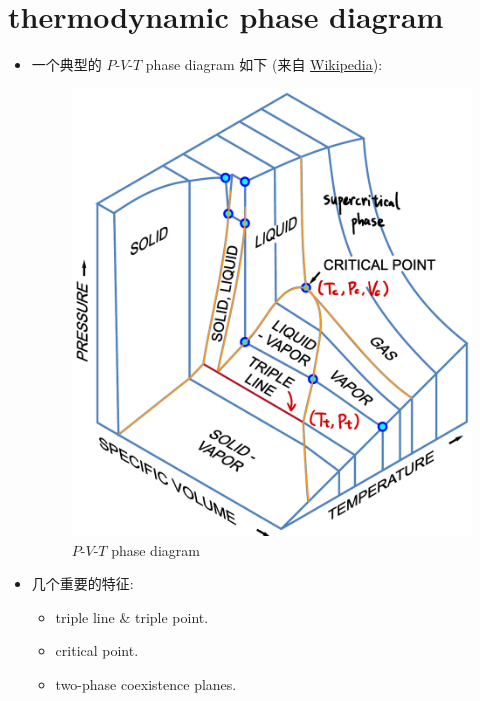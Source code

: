 \section{thermodynamic phase diagram}
\begin{itemize}
	\item 一个典型的 $P$-$V$-$T$ phase diagram 如下 (来自 \href{https://en.wikipedia.org/wiki/File:PVT_3D_diagram-en.svg}{Wikipedia}):
	
	\begin{figure}[H]
		\centering
		\includegraphics[scale=0.35]{figures/P-V-T phase diagram with comments.pdf}
		\caption{$P$-$V$-$T$ phase diagram}
	\end{figure}
	
	\item 几个重要的特征:
	\begin{itemize}
		\item triple line \& triple point.
		
		\item critical point.
		
		\item two-phase coexistence planes.
	\end{itemize}
\end{itemize}

